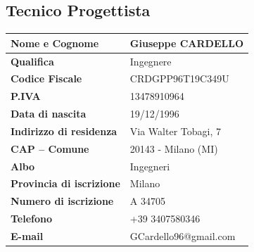 \subsection{Tecnico Progettista}
\begin{center}
\begin{tabular}{|p{6.5cm}|p{7cm}|}
\hline
\textbf{Nome e Cognome} & Giuseppe CARDELLO \\
\hline
\textbf{Qualifica} & Ingegnere \\
\hline
\textbf{Codice Fiscale} & CRDGPP96T19C349U \\
\hline
\textbf{P.IVA} & 13478910964 \\
\hline
\textbf{Data di nascita} & 19/12/1996 \\
\hline
\textbf{Indirizzo di residenza} & Via Walter Tobagi, 7 \\
\hline
\textbf{CAP -- Comune} & 20143 - Milano (MI) \\
\hline
\textbf{Albo} & Ingegneri \\
\hline
\textbf{Provincia di iscrizione} & Milano \\
\hline
\textbf{Numero di iscrizione} & A 34705 \\
\hline
\textbf{Telefono} & +39 3407580346 \\
\hline
\textbf{E-mail} & GCardello96@gmail.com \\
\hline
\end{tabular}
\end{center}